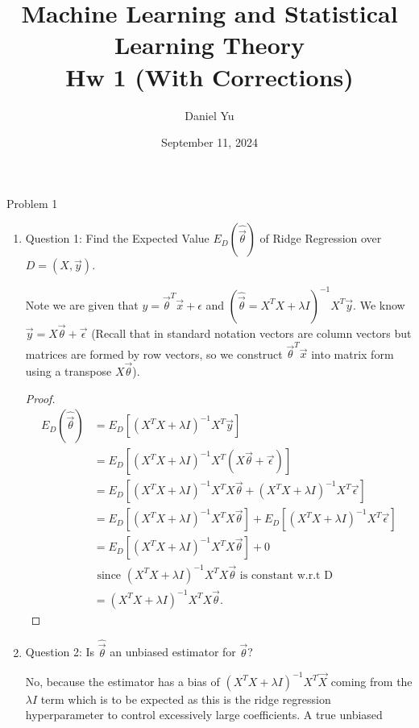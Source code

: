 \documentclass[a4paper]{article}
\title{\huge{Machine Learning and Statistical Learning Theory}\\ Hw 1 (With Corrections)}
\author{\huge{Daniel Yu}}
\date{September 11, 2024}
\begin{document}
\maketitle
\newpage%
\pagebreak
\begin{note}{Problem 1}
\begin{enumerate}
  \item Question 1: Find the Expected Value $E_D(\hat{\vec{\theta}})$ of Ridge Regression over $D=(X,\vec{y})$.
    \begin{note}
      Note we are given that $y = \vec{\theta}^T \vec{x} + \epsilon$ and  $(\hat{\vec{\theta}}=X^TX + \lambda I)^{-1} X^T \vec{y}$.
      We know $\vec{y} = X \vec{\theta} + \vec{\epsilon}$ (Recall that in standard notation vectors are column vectors but
      matrices are formed by row vectors, so we construct $\vec{\theta}^T \vec{x}$ into matrix form using a transpose
      $X \vec{\theta}$). 
    \end{note}
    \begin{proof} 
      \begin{align*}
        E_D(\hat{\vec{\theta}}) &= E_D[(X^T X + \lambda I)^{-1} X^T \vec{y}] \\
                                &= E_D[(X^T X + \lambda I)^{-1} X^T (X \vec{\theta} + \vec{\epsilon})] \\
                                &= E_D[(X^T X + \lambda I)^{-1}X^T X \vec{\theta} + (X^T X + \lambda I)^{-1} X^T \vec{\epsilon}] \\
                                &= E_D[(X^T X + \lambda I)^{-1}X^T X \vec{\theta}] + E_D[  (X^T X + \lambda I)^{-1} X^T \vec{\epsilon}] \\
                                &= E_D[(X^T X + \lambda I)^{-1}X^T X \vec{\theta}] + 0 \\
                                & \text{ since $(X^T X + \lambda I)^{-1}X^T X \vec{\theta}$ is constant w.r.t D} \\  
                                &= (X^T X + \lambda I)^{-1}X^T X\vec{\theta}
      .\end{align*}
    \end{proof}
  \item Question 2: Is $\hat{\vec{\theta}}$ an unbiased estimator for $\vec{\theta}$?
    \begin{note}
      No, because the estimator has a bias of $(X^T X + \lambda I)^{-1}X^T \vec{X}$ coming from the $\lambda I$ term which 
      is to be expected as this is the ridge regression hyperparameter to control excessively large coefficients. A true unbiased 

\end{note}
\end{enumerate}
\end{note}
\end{document}
